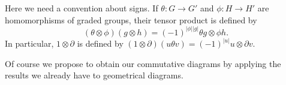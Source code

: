 \documentclass[../main]{subfiles}
\begin{document}
\begin{center}
 {
}
\end{center}

Here we need a convention about signs. If $\theta : G \rightarrow G'$ and $\phi:H \rightarrow H'$ are homomorphisms of graded groups, their tensor product is defined by \[(\theta \otimes \phi)(g \otimes h) = (-1)^{|\phi||g|}\theta g \otimes \phi h.\]  In particular, $1 \otimes \partial$ is defined by $(1 \otimes \partial)(u \theta v) = (-1)^{|u|}u \otimes \partial v$.

\par Of course we propose to obtain our commutative diagrams by applying the results we already have to geometrical diagrams.
\end{document}
